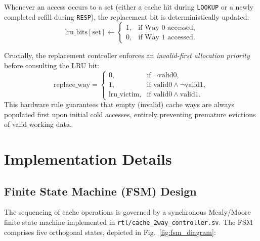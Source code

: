 \documentclass[conference]{IEEEtran}
\begin{document}
Whenever an access occurs to a set (either a cache hit during \texttt{LOOKUP} or a newly completed refill during \texttt{RESP}), the replacement bit is deterministically updated:
\begin{equation}
\text{lru\_bits}[\text{set}] \leftarrow \begin{cases}
1, & \text{if Way 0 accessed}, \\
0, & \text{if Way 1 accessed}.
\end{cases}
\end{equation}

Crucially, the replacement controller enforces an \textit{invalid-first allocation priority} before consulting the LRU bit:
\begin{equation}
\text{replace\_way} = \begin{cases}
0, & \text{if } \neg\text{valid0}, \\
1, & \text{if } \text{valid0} \land \neg\text{valid1}, \\
\text{lru\_victim}, & \text{if } \text{valid0} \land \text{valid1}.
\end{cases}
\end{equation}
This hardware rule guarantees that empty (invalid) cache ways are always populated first upon initial cold accesses, entirely preventing premature evictions of valid working data.

\section{Implementation Details}
\label{sec:implementation}

\subsection{Finite State Machine (FSM) Design}
The sequencing of cache operations is governed by a synchronous Mealy/Moore finite state machine implemented in \texttt{rtl/cache\_2way\_controller.sv}. The FSM comprises five orthogonal states, depicted in Fig.~\ref{fig:fsm_diagram}:
\end{document}
